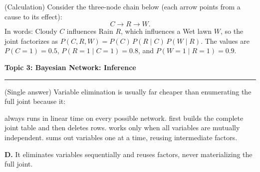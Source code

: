 \documentclass[answers,addpoints]{exam}
\newcommand{\topic}[2]{%
  \vspace{1.0\baselineskip}%
  \noindent\textbf{\large Topic #1: #2}\par
  \noindent\rule{\linewidth}{0.4pt}\par
  \vspace{0.4\baselineskip}}
\begin{document}
\begin{questions}
\question[5] (Calculation) Consider the three-node chain below (each arrow points
from a cause to its effect):
\[
  C \longrightarrow R \longrightarrow W .
\]
In words: Cloudy $C$ influences Rain $R$, which influences a Wet lawn $W$, so the
joint factorizes as $P(C,R,W)=P(C)\,P(R\mid C)\,P(W\mid R)$. The values are
$P(C{=}1)=0.5$, $P(R{=}1\mid C{=}1)=0.8$, and $P(W{=}1\mid R{=}1)=0.9$.

\topic{3}{Bayesian Network: Inference}

\question[2] (Single answer) Variable elimination is usually far cheaper than
enumerating the full joint because it:
\begin{choices}
  \choice always runs in linear time on every possible network.
  \choice first builds the complete joint table and then deletes rows.
  \choice works only when all variables are mutually independent.
  \CorrectChoice sums out variables one at a time, reusing intermediate factors.
\end{choices}
\begin{solution}\textbf{D.} It eliminates variables sequentially and reuses factors,
never materializing the full joint.\end{solution}


\end{questions}
\end{document}
